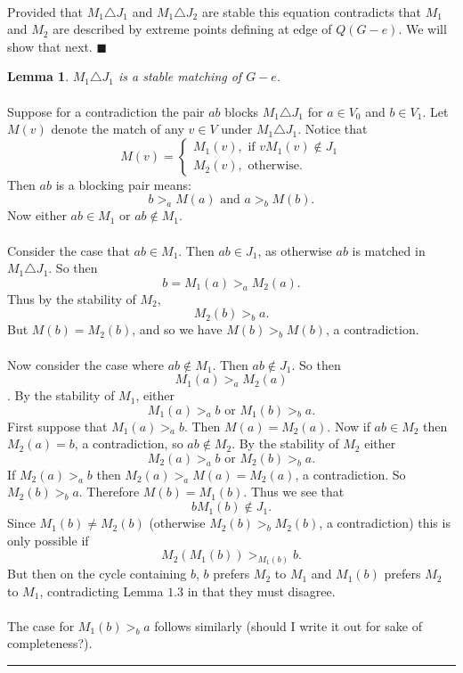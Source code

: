 \documentclass[letterpaper,12pt,oneside,onecolumn]{article}
\newtheorem{lemma}[fact]{Lemma}
\newenvironment{proof}{{\bf Proof:  }}{\hfill\rule{2mm}{2mm}}
\begin{document}
\paragraph{} Provided that $M_1 \triangle J_1$ and $M_1 \triangle J_2$ are stable this equation contradicts that $M_1$ and $M_2$ are described by extreme points defining at edge of $Q(G-e)$. We will show that next. $\blacksquare$
\begin{lemma}
$M_1 \triangle J_1$ is a stable matching of $G-e$.
\end{lemma}
\begin{proof}
\paragraph{}
Suppose for a contradiction the pair $ab$ blocks $M_1 \triangle J_1$ for $a \in V_0$ and $b \in V_1$. Let $M(v)$ denote the match of any $v \in V$ under $M_1 \triangle J_1$. Notice that
$$
M(v)=
\begin{cases}
M_1(v), \text{ if $vM_1(v) \not\in J_1$}\\
M_2(v), \text{ otherwise.}
\end{cases}
$$
Then $ab$ is a blocking pair means:
$$ b >_a M(a) \text{ and } a >_b M(b). $$
Now either $ab \in M_1$ or $ab \not\in M_1$.
\paragraph{}
Consider the case that $ab \in M_1$. Then $ab \in J_1$, as otherwise $ab$ is matched in $M_1 \triangle J_1$. So then
$$ b=M_1(a) >_a M_2(a).$$
Thus by the stability of $M_2$,
$$ M_2(b) >_b a. $$
But $M(b) = M_2(b)$, and so we have $M(b) >_b M(b)$, a contradiction.
\paragraph{}
Now consider the case where $ab \not\in M_1$. Then $ab \not\in J_1$. So then
$$ M_1(a) >_a M_2(a)$$.
By the stability of $M_1$, either
$$ M_1(a) >_a b \text{ or } M_1(b) >_b a. $$
First suppose that $M_1(a) >_a b$. Then $M(a) = M_2(a)$. Now if $ab \in M_2$ then $M_2(a) = b$, a contradiction, so $ab \not \in M_2$. By the stability of $M_2$ either
$$ M_2(a) >_a b \text{ or } M_2(b) >_b a. $$
If $M_2(a) >_a b$ then $M_2(a) >_a M(a) = M_2(a)$, a contradiction. So $M_2(b) >_b a$. Therefore $M(b) = M_1(b)$. Thus we see that
$$bM_1(b) \not\in J_1. $$
Since $M_1(b) \neq M_2(b)$ (otherwise $M_2(b) >_b M_2(b)$, a contradiction) this is only possible if
$$ M_2(M_1(b)) >_{M_1(b)} b. $$
But then on the cycle containing $b$, $b$ prefers $M_2$ to $M_1$ and $M_1(b)$ prefers $M_2$ to $M_1$, contradicting Lemma $1.3$ in that they must disagree.
\paragraph{}
The case for $M_1(b) >_b a$ follows similarly (should I write it out for sake of completeness?).
\end{proof}
\end{document}
